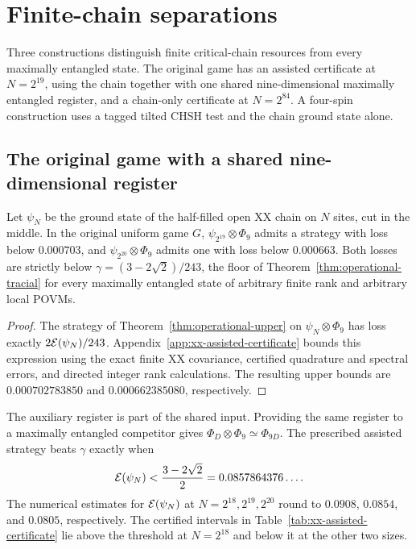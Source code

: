 \section{Finite-chain separations}\label{sec:finite-separation}

Three constructions distinguish finite critical-chain resources from
every maximally entangled state. The original game has an assisted
certificate at $N=2^{19}$, using the chain together with one shared
nine-dimensional maximally entangled register, and a chain-only
certificate at $N=2^{84}$. A four-spin construction uses a tagged
tilted CHSH test and the chain ground state alone.

\subsection{The original game with a shared nine-dimensional register}
\label{sec:xx-assisted-separation}

\begin{theorem}\label{thm:xx-assisted-separation}
Let $\psi_N$ be the ground state of the half-filled open XX chain on
$N$ sites, cut in the middle. In the original uniform game $G$,
$\psi_{2^{19}}\otimes\Phi_9$ admits a strategy with loss below
$0.000703$, and $\psi_{2^{20}}\otimes\Phi_9$ admits one with loss below
$0.000663$. Both losses are strictly below
$\gamma=(3-2\sqrt2)/243$, the floor of Theorem~\ref{thm:operational-tracial}
for every maximally entangled state of arbitrary finite rank and arbitrary
local POVMs.
\end{theorem}

\begin{proof}
The strategy of Theorem~\ref{thm:operational-upper} on
$\psi_N\otimes\Phi_9$ has loss exactly $2\mathcal{E}(\psi_N)/243$.
Appendix~\ref{app:xx-assisted-certificate} bounds this expression using
the exact finite XX covariance, certified quadrature and spectral errors,
and directed integer rank calculations. The resulting upper bounds are
$0.000702783850$ and $0.000662385080$, respectively.
\end{proof}

The auxiliary register is part of the shared input. Providing the same
register to a maximally entangled competitor gives
$\Phi_D\otimes\Phi_9\simeq\Phi_{9D}$.
The prescribed assisted strategy beats $\gamma$ exactly when
\[
 \mathcal{E}(\psi_N)<\frac{3-2\sqrt2}{2}=0.0857864376\ldots.
\]
The numerical estimates for $\mathcal{E}(\psi_N)$ at $N=2^{18},2^{19},2^{20}$
round to $0.0908$, $0.0854$, and $0.0805$, respectively. The certified
intervals in Table~\ref{tab:xx-assisted-certificate} lie above the threshold
at $N=2^{18}$ and below it at the other two sizes.

